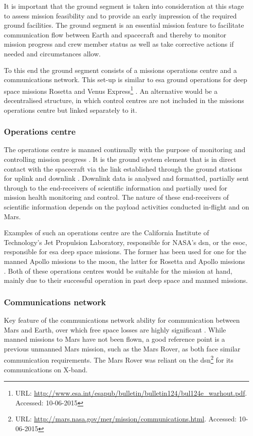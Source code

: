 It is important that the ground segment is taken into consideration at this stage to assess mission feasibility and to provide an early impression of the required ground facilities. The ground segment is an essential mission feature to facilitate communication flow between Earth and spacecraft and thereby to monitor mission progress and crew member status as well as take corrective actions if needed and circumstances allow.

To this end the ground segment consists of a missions operations centre and a communications network. This set-up is similar to \gls{esa} ground operations for deep space missions Rosetta and Venus Express\footnote{URL: \url{http://www.esa.int/esapub/bulletin/bulletin124/bul124e_warhout.pdf}. Accessed: 10-06-2015}  \cite{Warhaut2007}. An alternative would be a decentralised structure, in which control centres are not included in the missions operations centre but linked separately to it. 

\subsubsection{Operations centre}
The operations centre is manned continually with the purpose of monitoring and controlling mission progress \cite{Warhaut2007}. It is the ground system element that is in direct contact with the spacecraft via the link established through the ground stations for uplink and downlink \cite[p.879]{Wertz2011}. Downlink data is analysed and formatted, partially sent through to the end-receivers of scientific information and partially used for mission health monitoring and control. The nature of these end-receivers of scientific information depends on the payload activities conducted in-flight and on Mars. 

Examples of such an operations centre are the California Institute of Technology's Jet Propulsion Laboratory, responsible for NASA's \gls{dsn}, or the \gls{esoc}, responsible for \gls{esa} deep space missions. The former has been used for one for the manned Apollo missions to the moon, the latter for Rosetta and Apollo missions \cite[p.883]{Wertz2011}\cite{Warhaut2007}. Both of these operations centres would be suitable for the mission at hand, mainly due to their successful operation in past deep space and manned missions. 

\subsubsection{Communications network}
Key feature of the communications network ability for communication between Mars and Earth, over which free space losses are highly significant \cite{Wertz2011}. While manned missions to Mars have not been flown, a good reference point is a previous unmanned Mars mission, such as the Mars Rover, as both face similar communication requirements. The Mars Rover was reliant on the \gls{dsn}\footnote{URL: \url{http://mars.nasa.gov/mer/mission/communications.html}. Accessed: 10-06-2015} for its communications on X-band. 

